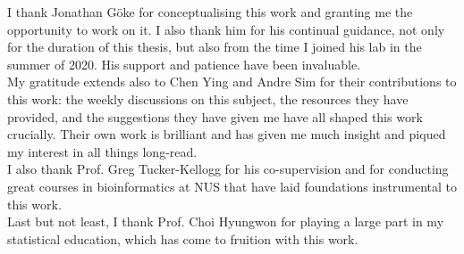 
I thank Jonathan Göke for conceptualising this work and granting me the opportunity to work on it. I also thank him for his continual guidance, not only for the duration of this thesis, but also from the time I joined his lab in the summer of 2020. His support and patience have been invaluable.\\[10pt]
My gratitude extends also to Chen Ying and Andre Sim for their contributions to this work: the weekly discussions on this subject, the resources they have provided, and the suggestions they have given me have all shaped this work crucially. Their own work is brilliant and has given me much insight and piqued my interest in all things long-read.\\[10pt]
I also thank Prof. Greg Tucker-Kellogg for his co-supervision and for conducting great courses in bioinformatics at NUS that have laid foundations instrumental to this work.\\[10pt] 
Last but not least, I thank Prof. Choi Hyungwon for playing a large part in my statistical education, which has come to fruition with this work.  